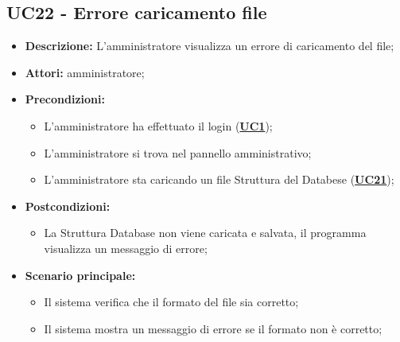 \subsection{UC22 - Errore caricamento file}
\label{sec:UC22}
\begin{itemize}
	\item \textbf{Descrizione:} L’amministratore visualizza un errore di caricamento del file;
	\item \textbf{Attori:} amministratore;
	\item \textbf{Precondizioni:} 
	\begin{itemize}
		\item L’amministratore ha effettuato il login (\hyperref[sec:UC1]{\textbf{UC1}});
		\item L’amministratore si trova nel pannello amministrativo;
		\item L’amministratore sta caricando un file Struttura del Databese (\hyperref[sec:UC21]{\textbf{UC21}});
	\end{itemize}
	\item \textbf{Postcondizioni:} 
	\begin{itemize}
		\item La Struttura Database non viene caricata e salvata, il programma visualizza un messaggio di errore;
	\end{itemize}
	\item \textbf{Scenario principale:} 
	\begin{itemize}
		\item Il sistema verifica che il formato del file sia corretto;
		\item Il sistema mostra un messaggio di errore se il formato non è corretto;
	\end{itemize}
\end{itemize}


